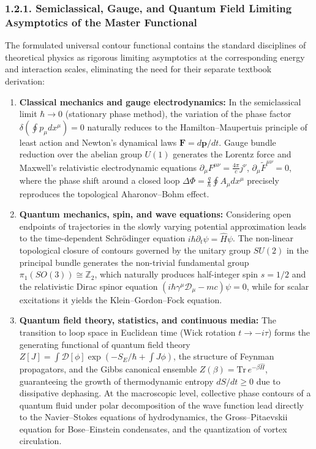 \subsubsection{1.2.1. Semiclassical, Gauge, and Quantum Field Limiting Asymptotics of the Master Functional}\label{sec:1.2.1}

The formulated universal contour functional contains the standard disciplines of theoretical physics as rigorous limiting asymptotics at the corresponding energy and interaction scales, eliminating the need for their separate textbook derivation:

\begin{enumerate}
\item \textbf{Classical mechanics and gauge electrodynamics:} In the semiclassical limit $\hbar \to 0$ (stationary phase method), the variation of the phase factor $\delta \left( \oint p_\mu dx^\mu \right) = 0$ naturally reduces to the Hamilton--Maupertuis principle of least action and Newton's dynamical laws $\mathbf{F} = d\mathbf{p}/dt$. Gauge bundle reduction over the abelian group $U(1)$ generates the Lorentz force and Maxwell's relativistic electrodynamic equations $\partial_\mu F^{\mu\nu} = \frac{4\pi}{c} j^\nu$, $\partial_\mu \tilde{F}^{\mu\nu} = 0$, where the phase shift around a closed loop $\Delta\Phi = \frac{q}{\hbar}\oint A_\mu dx^\mu$ precisely reproduces the topological Aharonov--Bohm effect.

\item \textbf{Quantum mechanics, spin, and wave equations:} Considering open endpoints of trajectories in the slowly varying potential approximation leads to the time-dependent Schr\"odinger equation $i\hbar \partial_t \psi = \hat{H}\psi$. The non-linear topological closure of contours governed by the unitary group $SU(2)$ in the principal bundle generates the non-trivial fundamental group $\pi_1(SO(3)) \cong \mathbb{Z}_2$, which naturally produces half-integer spin $s = 1/2$ and the relativistic Dirac spinor equation $(i\hbar \gamma^\mu \mathcal{D}_\mu - mc)\psi = 0$, while for scalar excitations it yields the Klein--Gordon--Fock equation.

\item \textbf{Quantum field theory, statistics, and continuous media:} The transition to loop space in Euclidean time (Wick rotation $t \to -i\tau$) forms the generating functional of quantum field theory $Z[J] = \int \mathcal{D}[\phi]\exp(-S_E/\hbar + \int J\phi)$, the structure of Feynman propagators, and the Gibbs canonical ensemble $Z(\beta) = \text{Tr}\,e^{-\beta \hat{H}}$, guaranteeing the growth of thermodynamic entropy $dS/dt \ge 0$ due to dissipative dephasing. At the macroscopic level, collective phase contours of a quantum fluid under polar decomposition of the wave function lead directly to the Navier--Stokes equations of hydrodynamics, the Gross--Pitaevskii equation for Bose--Einstein condensates, and the quantization of vortex circulation.
\end{enumerate}



